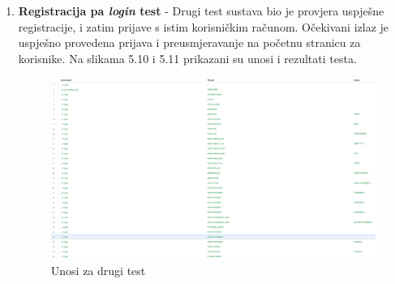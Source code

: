 \begin{enumerate}
\begin{figure}[H]
			 	\end{figure}
			 	\clearpage
			 	\item \textbf{Registracija pa \textit{login} test} - Drugi test sustava bio je provjera uspješne registracije, i zatim prijave s istim korisničkim računom. Očekivani izlaz je uspješno provedena prijava i preusmjeravanje na početnu stranicu za korisnike. Na slikama 5.10 i 5.11 prikazani su unosi i rezultati testa.
			 	\begin{figure}[H]
			 		\includegraphics[scale=0.3]{slike/testSustava4.PNG} %
			 		\centering
			 		\caption{Unosi za drugi test}
			 		\label{fig:testsustava3}
			 	\end{figure}
			 	\begin{figure}[H]

\end{figure}
\end{enumerate}
